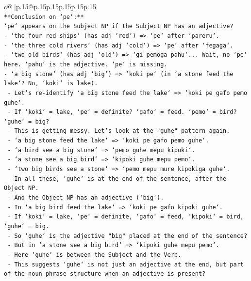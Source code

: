 \documentclass{article}
\begin{document}
{\begin{supertabular}{c@{$\;$}|p{.15\linewidth}@{}p{.15\linewidth}p{.15\linewidth}p{.15\linewidth}p{.15\linewidth}p{.15\linewidth}}
{{{\\ 
\texttt{**Conclusion on `pe`:**} \\
\texttt{`pe` appears on the Subject NP if the Subject NP has an adjective?} \\
\texttt{{-} `the four red ships` (has adj `red`) => `pe` after `pareru`.} \\
\texttt{{-} `the three cold rivers` (has adj `cold`) => `pe` after `fegaga`.} \\
\texttt{{-} `two old birds` (has adj `old`) => `gi pemoga pahu`... Wait, no `pe` here. `pahu` is the adjective. `pe` is missing.} \\
\texttt{{-} `a big stone` (has adj `big`) => `koki pe` (in `a stone feed the lake`? No, `koki` is lake).} \\
\texttt{  {-} Let's re{-}identify `a big stone feed the lake` => `koki pe gafo pemo guhe`.} \\
\texttt{  {-} If `koki` = lake, `pe` = definite? `gafo` = feed. `pemo` = bird? `guhe` = big?} \\
\texttt{  {-} This is getting messy. Let's look at the "guhe" pattern again.} \\
\texttt{  {-} `a big stone feed the lake` => `koki pe gafo pemo guhe`.} \\
\texttt{  {-} `a bird see a big stone` => `pemo guhe mepu kipoki`.} \\
\texttt{  {-} `a stone see a big bird` => `kipoki guhe mepu pemo`.} \\
\texttt{  {-} `two big birds see a stone` => `pemo mepu mure kipokiga guhe`.} \\
\texttt{  {-} In all these, `guhe` is at the end of the sentence, after the Object NP.} \\
\texttt{  {-} And the Object NP has an adjective (`big`).} \\
\texttt{  {-} In `a big bird feed the lake` => `koki pe gafo kipoki guhe`.} \\
\texttt{    {-} If `koki` = lake, `pe` = definite, `gafo` = feed, `kipoki` = bird, `guhe` = big.} \\
\texttt{    {-} So `guhe` is the adjective "big" placed at the end of the sentence?} \\
\texttt{    {-} But in `a stone see a big bird` => `kipoki guhe mepu pemo`.} \\
\texttt{    {-} Here `guhe` is between the Subject and the Verb.} \\
\texttt{    {-} This suggests `guhe` is not just an adjective at the end, but part of the noun phrase structure when an adjective is present?} \\
}}}
\end{supertabular}}
\end{document}
